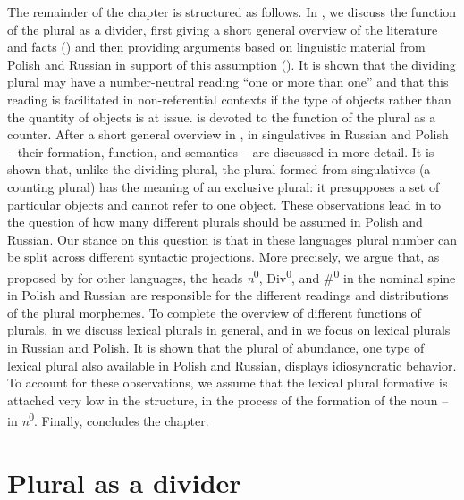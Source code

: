 \documentclass[output=paper,colorlinks,citecolor=brown]{langscibook}
\begin{document}
The remainder of the chapter is structured as follows. In , we discuss the function of the plural as a divider, first giving a short general overview of the literature and facts () and then providing arguments based on linguistic material from Polish and Russian in support of this assumption (). It is shown that the dividing plural may have a number-neutral reading ``one or more than one'' and that this reading is facilitated in non-referential contexts if the type of objects rather than the quantity of objects is at issue.  is devoted to the function of the plural as a counter. After a short general overview in , in  singulatives in Russian and Polish -- their formation, function, and semantics -- are discussed in more detail. It is shown that, unlike the dividing plural, the plural formed from singulatives (a counting plural) has the meaning of an exclusive plural: it presupposes a set of particular objects and cannot refer to one object. These observations lead in  to the question of how many different plurals should be assumed in Polish and Russian. Our stance on this question is that in these languages plural number can be split across different syntactic projections. More precisely, we argue that, as proposed by \citet{Mathieu2014} for other languages, the heads \textit{n}\textsuperscript{0}, Div\textsuperscript{0}, and \#\textsuperscript{0} in the nominal spine in Polish and Russian are responsible for the different readings and distributions of the plural morphemes. To complete the overview of different functions of plurals, in  we discuss lexical plurals in general, and in  we focus on lexical plurals in Russian and Polish. It is shown that the plural of abundance, one type of lexical plural also available in Polish and Russian, displays idiosyncratic behavior. To account for these observations, we assume that the lexical plural formative is attached very low in the structure, in the process of the formation of the noun -- in \textit{n}\textsuperscript{0}. Finally,  concludes the chapter.


\section{Plural as a divider}\label{sec:geist:2}
\end{document}
